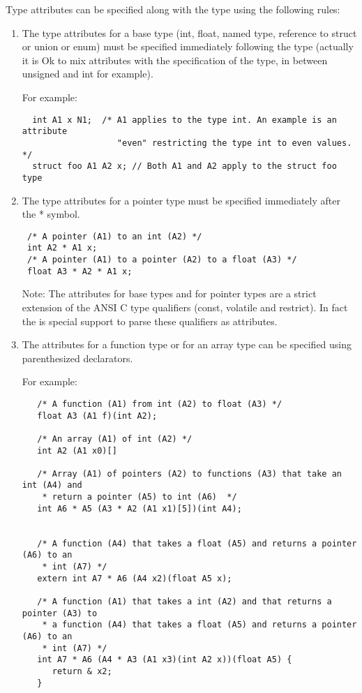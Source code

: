 \documentclass{book}
\begin{document}
 Type attributes can be specified along with the type using the following
 rules: 
\begin{enumerate}
 \item The type attributes for a base type (int, float, named type, reference
    to struct or union or enum) must be specified immediately following the
    type (actually it is Ok to mix attributes with the specification of the
    type, in between unsigned and int for example).

  For example:
\begin{verbatim}
  int A1 x N1;  /* A1 applies to the type int. An example is an attribute
                   "even" restricting the type int to even values. */
  struct foo A1 A2 x; // Both A1 and A2 apply to the struct foo type
\end{verbatim}
 
 \item The type attributes for a pointer type must be specified immediately
 after the * symbol.
\begin{verbatim}
 /* A pointer (A1) to an int (A2) */
 int A2 * A1 x;
 /* A pointer (A1) to a pointer (A2) to a float (A3) */
 float A3 * A2 * A1 x;
\end{verbatim}


 Note: The attributes for base types and for pointer types are a strict
 extension of the ANSI C type qualifiers (const, volatile and restrict). In
 fact the is special support to parse these qualifiers as attributes. 

  \item The attributes for a function type or for an array type can be
     specified using parenthesized declarators.

   For example:
\begin{verbatim}
   /* A function (A1) from int (A2) to float (A3) */
   float A3 (A1 f)(int A2);

   /* An array (A1) of int (A2) */
   int A2 (A1 x0)[]

   /* Array (A1) of pointers (A2) to functions (A3) that take an int (A4) and 
    * return a pointer (A5) to int (A6)  */
   int A6 * A5 (A3 * A2 (A1 x1)[5])(int A4);


   /* A function (A4) that takes a float (A5) and returns a pointer (A6) to an 
    * int (A7) */
   extern int A7 * A6 (A4 x2)(float A5 x);

   /* A function (A1) that takes a int (A2) and that returns a pointer (A3) to 
    * a function (A4) that takes a float (A5) and returns a pointer (A6) to an 
    * int (A7) */
   int A7 * A6 (A4 * A3 (A1 x3)(int A2 x))(float A5) {
      return & x2;
   }
\end{verbatim}

\end{enumerate}
\end{document}
